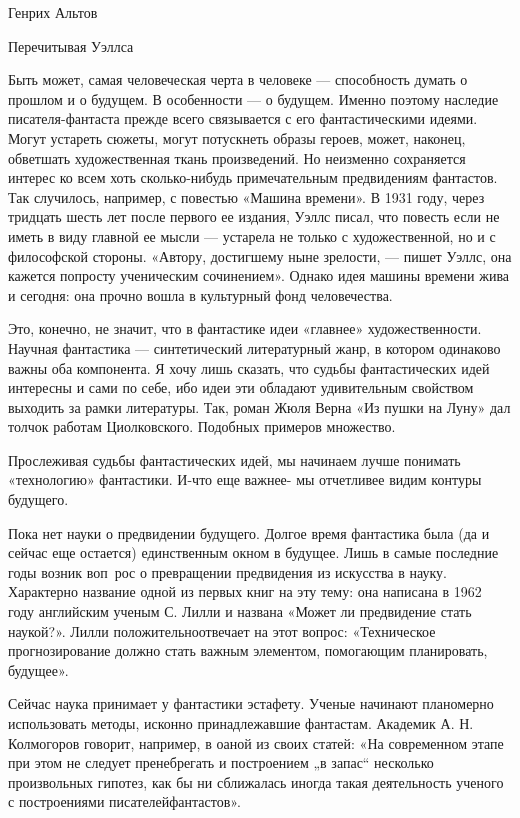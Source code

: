 
Генрих Альтов

Перечитывая Уэллса


Быть может, самая  человеческая черта  в человеке —  способность думать  о
прошлом и о будущем.  В особенности — о  будущем. Именно поэтому  наследие
писателя-фантаста прежде всего связывается  с его фантастическими  идеями.
Могут устареть  сюжеты, могут  потускнеть образы  героев, может,  наконец,
обветшать художественная  ткань  произведений.  Но  неизменно  сохраняется
интерес ко всем хоть сколько-нибудь примечательным предвидениям фантастов.
Так случилось, например, с повестью  «Машина времени». В 1931 году,  через
тридцать шесть лет после первого ее издания, Уэллс писал, что повесть если
не иметь в виду главной ее мысли — устарела не только с художественной, но
и с философской стороны. «Автору, достигшему ныне зрелости, — пишет Уэллс,
она кажется попросту ученическим  сочинением». Однако идея машины  времени
жива и сегодня: она прочно вошла в культурный фонд человечества.

Это, конечно, не значит, что в фантастике идеи «главнее» художественности.
Научная фантастика — синтетический литературный жанр, в котором  одинаково
важны оба компонента. Я хочу лишь сказать, что судьбы фантастических  идей
интересны и сами  по себе,  ибо идеи эти  обладают удивительным  свойством
выходить за рамки литературы. Так, роман Жюля Верна «Из пушки на Луну» дал
толчок работам Циолковского. Подобных примеров множество.

Прослеживая  судьбы  фантастических  идей,  мы  начинаем  лучше   понимать
«технологию» фантастики.  И-что еще  важнее- мы  отчетливее видим  контуры
будущего.

Пока нет науки о предвидении будущего. Долгое время фантастика была (да  и
сейчас еще остается) единственным окном в будущее. Лишь в самые  последние
годы возник  воп~рос  о  превращении предвидения  из  искусства  в  науку.
Характерно название одной из первых книг на эту тему: она написана в  1962
году английским  ученым С.  Лилли и  названа «Может  ли предвидение  стать
наукой?».  Лилли   положительноотвечает  на   этот  вопрос:   «Техническое
прогнозирование должно  стать  важным элементом,  помогающим  планировать,
будущее».

Сейчас наука принимает у  фантастики эстафету. Ученые начинают  планомерно
использовать методы,  исконно  принадлежавшие фантастам.  Академик  А.  Н.
Колмогоров говорит, например,  в оаной  из своих  статей: «На  современном
этапе при этом не следует  пренебрегать и построением „в запас“  несколько
произвольных гипотез,  как  бы  ни сближалась  иногда  такая  деятельность
ученого с построениями писателейфантастов».


